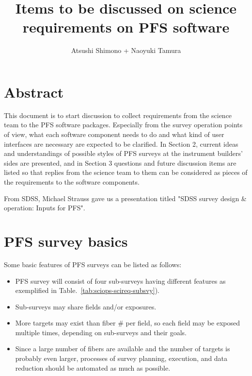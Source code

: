 \documentclass[a4paper,notitlepage]{article}
\title{Items to be discussed on science requirements on PFS software}
\author{Atsushi Shimono + Naoyuki Tamura}
\begin{document}

\ssnhead

\section{Abstract}

This document is to start discussion to collect requirements from the
science team to the PFS software packages. Especially from the survey
operation points of view, what each software component needs to do and
what kind of user interfaces are necessary are expected to be
clarified. In Section 2, current ideas and understandings of possible
styles of PFS surveys at the instrument builders' sides are presented,
and in Section 3 questions and future discussion items are listed so
that replies from the science team to them can be considered as pieces
of the requirements to the software components.

From SDSS, Michael Strauss gave us a presentation titled "SDSS survey
design \& operation: Inputs for PFS".

\section{PFS survey basics}

Some basic features of PFS surveys can be listed as follows:
\begin{itemize}
 \item PFS survey will consist of four sub-surveys having different
       features as exemplified in
       Table.~\ref{tab:sciops-scireq-subsvy}).
 \item Sub-surveys may share fields and/or exposures.
 \item More targets may exist than fiber \# per field, so each field
       may be exposed multiple times, depending on sub-surveys and
       their goals.
 \item Since a large number of fibers are available and the number of
       targets is probably even larger, processes of survey planning,
       execution, and data reduction should be automated as much as
       possible.
\end{itemize}
\end{document}
